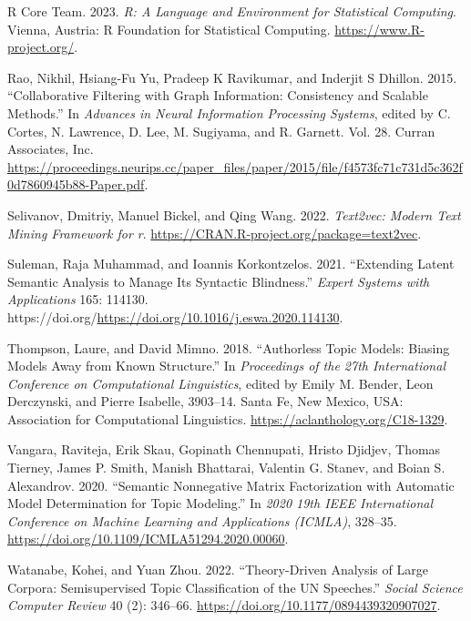 \documentclass[
]{article}
\newlength{\cslhangindent}
\newlength{\cslentryspacingunit} %
\newenvironment{CSLReferences}[2] %
 {%
  \setlength{\parindent}{0pt}
  \ifodd #1
  \let\oldpar\par
  \def\par{\hangindent=\cslhangindent\oldpar}
  \fi
  \setlength{\parskip}{#2\cslentryspacingunit}
 }%
 {}
\begin{document}
\begin{CSLReferences}{1}{0}
\leavevmode{}%
R Core Team. 2023. \emph{R: A Language and Environment for Statistical Computing}. Vienna, Austria: R Foundation for Statistical Computing. \url{https://www.R-project.org/}.

\leavevmode{}%
Rao, Nikhil, Hsiang-Fu Yu, Pradeep K Ravikumar, and Inderjit S Dhillon. 2015. {``Collaborative Filtering with Graph Information: Consistency and Scalable Methods.''} In \emph{Advances in Neural Information Processing Systems}, edited by C. Cortes, N. Lawrence, D. Lee, M. Sugiyama, and R. Garnett. Vol. 28. Curran Associates, Inc. \url{https://proceedings.neurips.cc/paper_files/paper/2015/file/f4573fc71c731d5c362f0d7860945b88-Paper.pdf}.

\leavevmode{}%
Selivanov, Dmitriy, Manuel Bickel, and Qing Wang. 2022. \emph{Text2vec: Modern Text Mining Framework for r}. \url{https://CRAN.R-project.org/package=text2vec}.

\leavevmode{}%
Suleman, Raja Muhammad, and Ioannis Korkontzelos. 2021. {``Extending Latent Semantic Analysis to Manage Its Syntactic Blindness.''} \emph{Expert Systems with Applications} 165: 114130. https://doi.org/\url{https://doi.org/10.1016/j.eswa.2020.114130}.

\leavevmode{}%
Thompson, Laure, and David Mimno. 2018. {``Authorless Topic Models: Biasing Models Away from Known Structure.''} In \emph{Proceedings of the 27th International Conference on Computational Linguistics}, edited by Emily M. Bender, Leon Derczynski, and Pierre Isabelle, 3903--14. Santa Fe, New Mexico, USA: Association for Computational Linguistics. \url{https://aclanthology.org/C18-1329}.

\leavevmode{}%
Vangara, Raviteja, Erik Skau, Gopinath Chennupati, Hristo Djidjev, Thomas Tierney, James P. Smith, Manish Bhattarai, Valentin G. Stanev, and Boian S. Alexandrov. 2020. {``Semantic Nonnegative Matrix Factorization with Automatic Model Determination for Topic Modeling.''} In \emph{2020 19th IEEE International Conference on Machine Learning and Applications (ICMLA)}, 328--35. \url{https://doi.org/10.1109/ICMLA51294.2020.00060}.

\leavevmode{}%
Watanabe, Kohei, and Yuan Zhou. 2022. {``Theory-Driven Analysis of Large Corpora: Semisupervised Topic Classification of the UN Speeches.''} \emph{Social Science Computer Review} 40 (2): 346--66. \url{https://doi.org/10.1177/0894439320907027}.


\end{CSLReferences}
\end{document}
